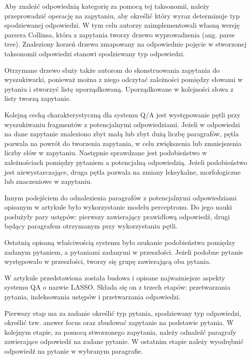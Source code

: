 Aby znaleźć odpowiednią kategorię za pomocą tej taksonomii, należy przeprowadzić operację na zapytaniu, aby określić który wyraz determinuje typ spodziewanej odpowiedzi. W tym celu autorzy zaimplementowali własną wersję parsera Collinsa, która z zapytania tworzy drzewo wyprowadzenia (ang. parse tree). Znaleziony korzeń drzewa zmapowany na odpowiednie pojęcie w stworzonej taksonomii odpowiedzi stanowi spodziewany typ odpowiedzi. 

Otrzymane drzewo służy także autorom do skonstruowania zapytania do wyszukiwarki, ponieważ można z niego odczytać zależności pomiędzy słowami w pytaniu i stworzyć listę uporządkowaną. Uporządkowane w kolejności słowa z listy tworzą zapytanie. 

Kolejną cechą charakterystyczną dla systemu Q/A jest występowanie pętli przy wyszukiwaniu fragmentów z potencjalnymi odpowiedziami. Jeżeli w odpowiedzi na dane zapytanie znaleziono zbyt małą lub zbyt dużą liczbę paragrafów, pętla pozwala na powrót do tworzenia zapytania, w celu zwiększenia lub zmniejszenia liczby słów w zapytaniu. Następnie sprawdzane jest podobieństwo w zależnościach pomiędzy pytaniem a potencjalną odpowiedzią. Jeżeli podobieństwo jest niewystarczające, druga pętla pozwala na zmiany leksykalne, morfologiczne lub znaczeniowe w zapytaniu. 

Innym podejściem do odnalezienia paragrafów z potencjalnymi odpowiedziami opisanym w artykule było wykorzystanie modelu perceptronu. Do jego nauki posłużyły pary ustępów: pierwszy zawierający prawidłową odpowiedź, drugi będący paragrafem otrzymanym przy wykorzystaniu pętli.

Ostatnią opisaną właściwością systemu było szukanie podobieństwa pomiędzy zadanym pytaniem, a pytaniami zadanymi w przeszłości. Jeżeli podobne pytanie występowało w przeszłości, tworzy się grupę zawierającą oba pytania.

W artykule \cite{moldovan-etal-2000-structure} przedstawiona została budowa i opisane najważniejsze aspekty systemu QA o nazwie LASSO. Składa się on z trzech etapów: przetwarzania pytania, indeksowania ustępów i przetwarzania odpowiedzi. 

Pierwszy etap ma za zadanie określić typ pytania, spodziewany typ odpowiedzi, określić tzw. answer focus oraz zbudować zapytanie na podstawie pytania. W kolejnym etapie, za pomocą stworzonego zapytania,  należy odnaleźć paragrafy zawierające odpowiedź na zadane pytanie. W ostatnim etapie należy wyodrębnić odpowiedź na pytanie w wybranym paragrafie.

